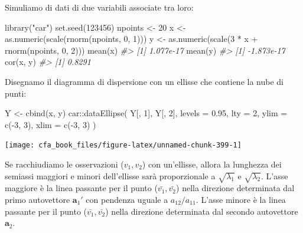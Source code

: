 \documentclass[
  11pt,
]{krantz}
\makeatletter
\newenvironment{Shaded}{\begin{snugshade}}{\end{snugshade}}
\newcommand{\AttributeTok}[1]{\textcolor[rgb]{0.61,0.61,0.61}{#1}}
\newcommand{\CommentTok}[1]{\textcolor[rgb]{0.37,0.37,0.37}{\textit{#1}}}
\newcommand{\DecValTok}[1]{\textcolor[rgb]{0.06,0.06,0.06}{#1}}
\newcommand{\FloatTok}[1]{\textcolor[rgb]{0.06,0.06,0.06}{#1}}
\newcommand{\FunctionTok}[1]{\textcolor[rgb]{0,0,0}{#1}}
\newcommand{\NormalTok}[1]{#1}
\newcommand{\OtherTok}[1]{\textcolor[rgb]{0.37,0.37,0.37}{#1}}
\newcommand{\SpecialCharTok}[1]{\textcolor[rgb]{0,0,0}{#1}}
\newcommand{\StringTok}[1]{\textcolor[rgb]{0.5,0.5,0.5}{#1}}
\newenvironment{kframe}{%
\medskip{}
\setlength{\fboxsep}{.8em}
 \def\at@end@of@kframe{}%
 \ifinner\ifhmode%
  \def\at@end@of@kframe{\end{minipage}}%
  \begin{minipage}{\columnwidth}%
 \fi\fi%
 \def\FrameCommand##1{\hskip\@totalleftmargin \hskip-\fboxsep
 \colorbox{shadecolor}{##1}\hskip-\fboxsep
     \hskip-\linewidth \hskip-\@totalleftmargin \hskip\columnwidth}%
 \MakeFramed {\advance\hsize-\width
   \@totalleftmargin\z@ \linewidth\hsize
   \@setminipage}}%
 {\par\unskip\endMakeFramed%
 \at@end@of@kframe}
\renewenvironment{Shaded}{\begin{kframe}}{\end{kframe}}
\theoremstyle{definition}
\theoremstyle{definition}
\theoremstyle{definition}
\theoremstyle{definition}
\theoremstyle{remark}
\makeatother
\begin{document}
Simuliamo di dati di due variabili associate tra loro:

\begin{Shaded}
\begin{Highlighting}[]
\FunctionTok{library}\NormalTok{(}\StringTok{"car"}\NormalTok{)}
\FunctionTok{set.seed}\NormalTok{(}\DecValTok{123456}\NormalTok{)}
\NormalTok{npoints }\OtherTok{\textless{}{-}} \DecValTok{20}
\NormalTok{x }\OtherTok{\textless{}{-}} \FunctionTok{as.numeric}\NormalTok{(}\FunctionTok{scale}\NormalTok{(}\FunctionTok{rnorm}\NormalTok{(npoints, }\DecValTok{0}\NormalTok{, }\DecValTok{1}\NormalTok{)))}
\NormalTok{y }\OtherTok{\textless{}{-}} \FunctionTok{as.numeric}\NormalTok{(}\FunctionTok{scale}\NormalTok{(}\DecValTok{3} \SpecialCharTok{*}\NormalTok{ x }\SpecialCharTok{+} \FunctionTok{rnorm}\NormalTok{(npoints, }\DecValTok{0}\NormalTok{, }\DecValTok{2}\NormalTok{)))}
\FunctionTok{mean}\NormalTok{(x)}
\CommentTok{\#\textgreater{} [1] 1.077e{-}17}
\FunctionTok{mean}\NormalTok{(y)}
\CommentTok{\#\textgreater{} [1] {-}1.873e{-}17}
\FunctionTok{cor}\NormalTok{(x, y)}
\CommentTok{\#\textgreater{} [1] 0.8291}
\end{Highlighting}
\end{Shaded}

Disegnamo il diagramma di dispersione con un ellisse che contiene la nube di punti:

\begin{Shaded}
\begin{Highlighting}[]
\NormalTok{Y }\OtherTok{\textless{}{-}} \FunctionTok{cbind}\NormalTok{(x, y)}
\NormalTok{car}\SpecialCharTok{::}\FunctionTok{dataEllipse}\NormalTok{(}
\NormalTok{  Y[, }\DecValTok{1}\NormalTok{], Y[, }\DecValTok{2}\NormalTok{],}
  \AttributeTok{levels =} \FloatTok{0.95}\NormalTok{,}
  \AttributeTok{lty =} \DecValTok{2}\NormalTok{,}
  \AttributeTok{ylim =} \FunctionTok{c}\NormalTok{(}\SpecialCharTok{{-}}\DecValTok{3}\NormalTok{, }\DecValTok{3}\NormalTok{),}
  \AttributeTok{xlim =} \FunctionTok{c}\NormalTok{(}\SpecialCharTok{{-}}\DecValTok{3}\NormalTok{, }\DecValTok{3}\NormalTok{)}
\NormalTok{)}
\end{Highlighting}
\end{Shaded}

\begin{center}\texttt{[image: cfa\_book\_files/figure-latex/unnamed-chunk-399-1]} \end{center}

Se racchiudiamo le osservazioni (\(v_1, v_2\)) con un'ellisse, allora la lunghezza dei semiassi maggiori e minori dell'ellisse sarà proporzionale a \(\sqrt{\lambda_1}\) e \(\sqrt{\lambda_2}\). L'asse maggiore è la linea passante per il punto (\(\bar{v_1}, \bar{v_2}\)) nella direzione determinata dal primo autovettore \(\boldsymbol{a}_1'\) con pendenza uguale a \(a_{12}/a_{11}\). L'asse minore è la linea passante per il punto (\(\bar{v_1}, \bar{v_2}\)) nella direzione determinata dal secondo autovettore \(\boldsymbol{a}_2\).
\end{document}
